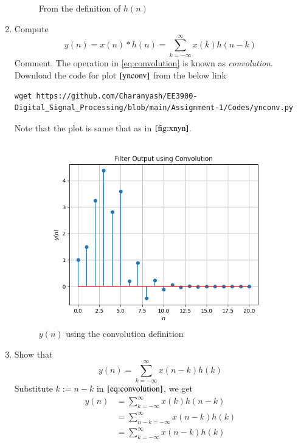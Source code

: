 \documentclass[journal,12pt,twocolumn]{IEEEtran}
\renewcommand\thesection{\arabic{section}}
\begin{document}
\begin{enumerate}[label=\thesection.\arabic*]
\begin{figure}[ht!]
      \caption{From the definition of $h(n)$}
      \label{hndef}
     \end{figure}
    \item Compute 
     \begin{equation}
     \label{eq:convolution}
     y(n) = x(n)*h(n) = \sum_{k=-\infty}^{\infty}x(k)h(n-k)
     \end{equation}
     Comment. The operation in \eqref{eq:convolution} is known as
     {\em convolution}.\\
     \solution Download the code for plot $\ref{ynconv}$ from the below link
      \begin{lstlisting}
wget https://github.com/Charanyash/EE3900-Digital_Signal_Processing/blob/main/Assignment-1/Codes/ynconv.py
      \end{lstlisting}
      Note that the plot is same that as in $\ref{fig:xnyn}$.
      \begin{figure}[ht!]
        \centering
        \includegraphics[width = \columnwidth]{ynconv.png}
        \caption{$y(n)$ using the convolution definition}
        \label{ynconv}
      \end{figure}
    \item Show that
     \begin{equation}
      y(n) =  \sum_{k=-\infty}^{\infty}x(n-k)h(k)
      \end{equation}
    \solution Substitute $k := n-k$ in $\eqref{eq:convolution}$, we get 
     \begin{align}
       y(n) &= \sum_{k=-\infty}^{\infty}x(k)h(n-k)\\
            &= \sum_{n - k=-\infty}^{\infty}x(n-k)h(k)\\
            &= \sum_{k = -\infty}^{\infty}x(n-k)h(k)
     \end{align}
       
\end{enumerate}
\end{document}
